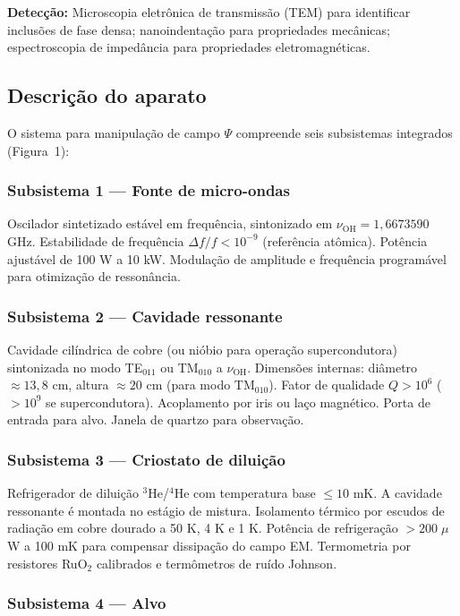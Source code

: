 \documentclass[12pt,a4paper]{article}
\newcommand{\nuOH}{\nu_{\text{OH}}}
\begin{document}
\textbf{Detecção:} Microscopia eletrônica de transmissão
(TEM) para identificar inclusões de fase densa; nanoindentação
para propriedades mecânicas; espectroscopia de impedância para
propriedades eletromagnéticas.

\subsection{Descrição do aparato}

O sistema para manipulação de campo $\Psi$ compreende seis
subsistemas integrados (Figura~1):

\subsubsection{Subsistema 1 --- Fonte de micro-ondas}

Oscilador sintetizado estável em frequência, sintonizado em
$\nuOH = 1{,}6673590$ GHz. Estabilidade de frequência
$\Delta f / f < 10^{-9}$ (referência atômica). Potência
ajustável de 100 W a 10 kW. Modulação de amplitude e
frequência programável para otimização de ressonância.

\subsubsection{Subsistema 2 --- Cavidade ressonante}

Cavidade cilíndrica de cobre (ou nióbio para operação
supercondutora) sintonizada no modo TE$_{011}$ ou TM$_{010}$
a $\nuOH$. Dimensões internas: diâmetro $\approx 13{,}8$ cm,
altura $\approx 20$ cm (para modo TM$_{010}$). Fator de
qualidade $Q > 10^6$ ($> 10^9$ se supercondutora). Acoplamento
por iris ou laço magnético. Porta de entrada para alvo.
Janela de quartzo para observação.

\subsubsection{Subsistema 3 --- Criostato de diluição}

Refrigerador de diluição $^3$He/$^4$He com temperatura base
$\leq 10$ mK. A cavidade ressonante é montada no estágio de
mistura. Isolamento térmico por escudos de radiação em cobre
dourado a 50 K, 4 K e 1 K. Potência de refrigeração
$> 200\;\mu$W a 100 mK para compensar dissipação do campo EM.
Termometria por resistores RuO$_2$ calibrados e termômetros
de ruído Johnson.

\subsubsection{Subsistema 4 --- Alvo}
\end{document}
